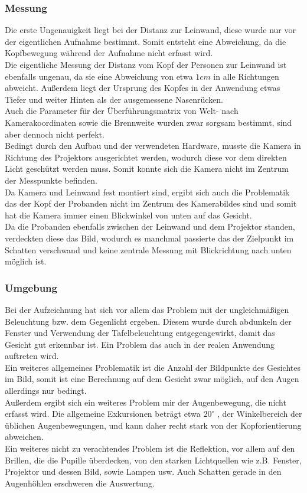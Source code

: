 \subsubsection{Messung}
Die erste Ungenauigkeit liegt bei der Distanz zur Leinwand, diese wurde nur vor der eigentlichen Aufnahme bestimmt. Somit entsteht eine Abweichung, da die Kopfbewegung während der Aufnahme nicht erfasst wird.\\
Die eigentliche Messung der Distanz  vom Kopf der Personen zur Leinwand ist ebenfalls ungenau, da sie eine Abweichung von etwa $1cm$ in alle Richtungen abweicht. Außerdem liegt der Ursprung des Kopfes in der Anwendung etwas Tiefer und weiter Hinten als der ausgemessene Nasenrücken.\\
Auch die Parameter für der Überführungsmatrix von Welt- nach Kamerakoordinaten sowie die Brennweite wurden zwar sorgsam bestimmt, sind aber dennoch nicht perfekt.\\
Bedingt durch den Aufbau und der verwendeten Hardware, musste die Kamera in Richtung des Projektors ausgerichtet werden, wodurch diese vor dem direkten Licht geschützt werden muss. Somit konnte sich die Kamera nicht im Zentrum der Messpunkte befinden.\\
Da Kamera und Leinwand fest montiert sind, ergibt sich auch die Problematik das der Kopf der Probanden nicht im Zentrum des Kamerabildes sind und somit hat die Kamera immer einen Blickwinkel von unten auf das Gesicht.\\
Da die Probanden ebenfalls zwischen der Leinwand und dem Projektor standen, verdeckten diese das Bild, wodurch es manchmal passierte das der Zielpunkt im Schatten verschwand und keine zentrale Messung mit Blickrichtung nach unten möglich ist.
\subsubsection{Umgebung}
Bei der Aufzeichnung hat sich vor allem das Problem mit der ungleichmäßigen Beleuchtung bzw. dem Gegenlicht ergeben. Diesem wurde durch abdunkeln der Fenster und Verwendung der Tafelbeleuchtung entgegengewirkt, damit das Gesicht gut erkennbar ist. Ein Problem das auch in der realen Anwendung auftreten wird.\\
Ein weiteres allgemeines Problematik ist die Anzahl der Bildpunkte des Gesichtes im Bild, somit ist eine Berechnung auf dem Gesicht zwar möglich, auf den Augen allerdings nur bedingt.\\
Außerdem ergibt sich ein weiteres Problem mir der Augenbewegung, die nicht erfasst wird. Die allgemeine Exkursionen beträgt etwa $20^\circ$ \cite{wiki_Gesichtsfeld}, der Winkelbereich der üblichen Augenbewegungen, und kann daher recht stark von der Kopforientierung abweichen.\\
Ein weiteres nicht zu verachtendes Problem ist die Reflektion, vor allem auf den Brillen, die die Pupille überdecken, von den starken Lichtquellen wie z.B. Fenster, Projektor und dessen Bild, sowie Lampen usw. Auch Schatten gerade in den Augenhöhlen erschweren die Auswertung.